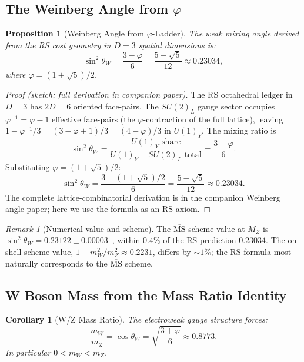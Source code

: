 \documentclass[12pt,a4paper]{article}
\newtheorem{corollary}[theorem]{Corollary}
\newtheorem{proposition}[theorem]{Proposition}
\theoremstyle{definition}
\theoremstyle{remark}
\newtheorem{remark}[theorem]{Remark}
\begin{document}
\subsection{The Weinberg Angle from $\varphi$}

\begin{proposition}[Weinberg Angle from $\varphi$-Ladder]
\label{prop:weinberg}
The weak mixing angle derived from the RS cost geometry in $D = 3$
spatial dimensions is:
\begin{equation}
  \boxed{\sin^2\theta_W = \frac{3 - \varphi}{6}
  = \frac{5 - \sqrt{5}}{12} \approx 0.23034,}
\end{equation}
where $\varphi = (1+\sqrt{5})/2$.
\end{proposition}

\begin{proof}[Proof (sketch; full derivation in companion paper)]
The RS octahedral ledger in $D = 3$ has $2D = 6$ oriented face-pairs.
The $SU(2)_L$ gauge sector occupies $\varphi^{-1} = \varphi - 1$
effective face-pairs (the $\varphi$-contraction of the full lattice),
leaving $1 - \varphi^{-1}/3 = (3 - \varphi + 1)/3 = (4 - \varphi)/3$
in $U(1)_Y$.  The mixing ratio is
\[
  \sin^2\theta_W
  = \frac{U(1)_Y \text{ share}}{U(1)_Y + SU(2)_L \text{ total}}
  = \frac{3 - \varphi}{6}.
\]
Substituting $\varphi = (1+\sqrt{5})/2$:
\[
  \sin^2\theta_W = \frac{3 - (1+\sqrt{5})/2}{6}
  = \frac{5 - \sqrt{5}}{12} \approx 0.23034.
\]
The complete lattice-combinatorial derivation is in the companion
Weinberg angle paper; here we use the formula as an RS axiom.
\end{proof}

\begin{remark}[Numerical value and scheme]
\label{rem:scheme}
The $\overline{\mathrm{MS}}$ scheme value at $M_Z$ is
$\sin^2\theta_W = 0.23122 \pm 0.00003$~\cite{PDG2024}, within $0.4\%$
of the RS prediction $0.23034$.  The on-shell scheme value,
$1 - m_W^2/m_Z^2 \approx 0.2231$, differs by $\sim 1\%$; the RS
formula most naturally corresponds to the $\overline{\mathrm{MS}}$
scheme.
\end{remark}

\subsection{W Boson Mass from the Mass Ratio Identity}

\begin{corollary}[W/Z Mass Ratio]
\label{thm:ratio}
The electroweak gauge structure forces:
\begin{equation}
  \frac{m_W}{m_Z} = \cos\theta_W = \sqrt{\frac{3+\varphi}{6}}
  \approx 0.8773.
\end{equation}
In particular $0 < m_W < m_Z$.
\end{corollary}
\end{document}
